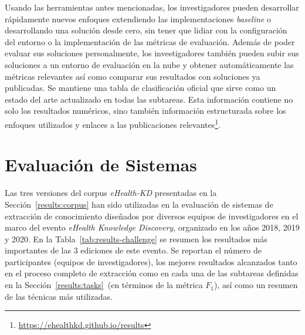 Usando las herramientas antes mencionadas, los investigadores pueden desarrollar rápidamente nuevos enfoques extendiendo las implementaciones \textit{baseline} o desarrollando una solución desde cero, sin tener que lidiar con la configuración del entorno o la implementación de las métricas de evaluación.
Además de poder evaluar sus soluciones personalmente, los investigadores también pueden subir
sus soluciones a un entorno de evaluación en la nube y obtener automáticamente las métricas relevantes
así como comparar sus resultados con soluciones ya publicadas.
Se mantiene una tabla de clasificación oficial que sirve como un estado del arte actualizado en todas las subtareas.
Esta información contiene no solo los resultados numéricos, sino también información estructurada sobre los enfoques utilizados y enlaces a las publicaciones relevantes\footnote{\url{https://ehealthkd.github.io/results}}.

\section{Evaluación de Sistemas}\label{results:challenge}

Las tres versiones del corpus \textit{eHealth-KD} presentadas en la Sección~\ref{results:corpus} han sido utilizadas en la evaluación de sistemas de extracción de conocimiento diseñados por diversos equipos de investigadores en el marco del evento \textit{eHealth Knowledge Discovery}, organizado en los años 2018, 2019 y 2020. En la Tabla~\ref{tab:results-challenge} se resumen los resultados más importantes de las 3 ediciones de este evento. Se reportan el número de participantes (equipos de investigadores), los mejores resultados alcanzados tanto en el proceso completo de extracción como en cada una de las subtareas definidas en la Sección~\ref{results:tasks}~(en términos de la métrica $F_1$), así como un resumen de las técnicas más utilizadas.

